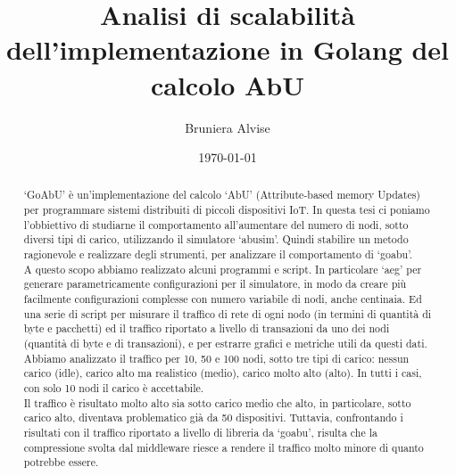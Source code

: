\documentclass{article}
\title{Analisi di scalabilità dell'implementazione in Golang del calcolo AbU}
\author{Bruniera Alvise}
\affil{Università degli studi di Udine}
\date{\today}
\newcommand{\michele}[1]{{\color{red}Michele:~}{\itshape``{#1}''}}
\begin{document}
\maketitle

\newpage
\begin{abstract}
    `GoAbU' è un'implementazione del calcolo `AbU' (Attribute-based memory Updates) per programmare sistemi distribuiti di piccoli dispositivi IoT. In questa tesi ci poniamo l'obbiettivo di studiarne il comportamento all'aumentare del numero di nodi, sotto diversi tipi di carico, utilizzando il simulatore `abusim'. Quindi stabilire un metodo ragionevole e realizzare degli strumenti, per analizzare il comportamento di `goabu'.\\
    A questo scopo abbiamo realizzato alcuni programmi e script. In particolare `aeg' per generare parametricamente configurazioni per il simulatore, in modo da creare più facilmente configurazioni complesse con numero variabile di nodi, anche centinaia. Ed una serie di script per misurare il traffico di rete di ogni nodo (in termini di quantità di byte e pacchetti) ed il traffico riportato a livello di transazioni da uno dei nodi (quantità di byte e di transazioni), e per estrarre grafici e metriche utili da questi dati.\\
    Abbiamo analizzato il traffico per 10, 50 e 100 nodi, sotto tre tipi di carico: nessun carico (idle), carico alto ma realistico (medio), carico molto alto (alto). In tutti i casi, con solo 10 nodi il carico è accettabile.\\
    Il traffico è risultato molto alto sia sotto carico medio che alto, in particolare, sotto carico alto, diventava problematico già da 50 dispositivi. Tuttavia, confrontando i risultati con il traffico riportato a livello di libreria da `goabu', risulta che la compressione svolta dal middleware riesce a rendere il traffico molto minore di quanto potrebbe essere.

\end{abstract}
\end{document}
